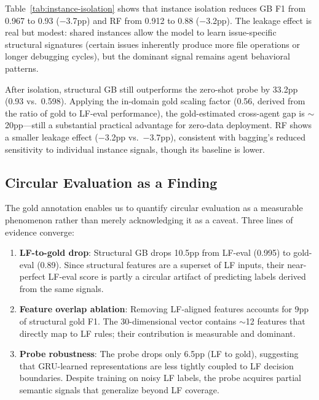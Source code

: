 \documentclass[11pt,a4paper]{article}
\begin{document}
Table~\ref{tab:instance-isolation} shows that instance isolation reduces GB F1 from 0.967 to 0.93 ($-$3.7pp) and RF from 0.912 to 0.88 ($-$3.2pp).
The leakage effect is real but modest: shared instances allow the model to learn issue-specific structural signatures (certain issues inherently produce more file operations or longer debugging cycles), but the dominant signal remains agent behavioral patterns.

After isolation, structural GB still outperforms the zero-shot probe by 33.2pp (0.93 vs.\ 0.598).
Applying the in-domain gold scaling factor (0.56, derived from the ratio of gold to LF-eval performance), the gold-estimated cross-agent gap is $\sim$20pp---still a substantial practical advantage for zero-data deployment.
RF shows a smaller leakage effect ($-$3.2pp vs.\ $-$3.7pp), consistent with bagging's reduced sensitivity to individual instance signals, though its baseline is lower.

\subsection{Circular Evaluation as a Finding}
\label{sec:circular}

The gold annotation enables us to quantify circular evaluation as a measurable phenomenon rather than merely acknowledging it as a caveat.
Three lines of evidence converge:

\begin{enumerate}[leftmargin=*,nosep]
\item \textbf{LF-to-gold drop}: Structural GB drops 10.5pp from LF-eval (0.995) to gold-eval (0.89). Since structural features are a superset of LF inputs, their near-perfect LF-eval score is partly a circular artifact of predicting labels derived from the same signals.

\item \textbf{Feature overlap ablation}: Removing LF-aligned features accounts for 9pp of structural gold F1. The 30-dimensional vector contains $\sim$12 features that directly map to LF rules; their contribution is measurable and dominant.

\item \textbf{Probe robustness}: The probe drops only 6.5pp (LF to gold), suggesting that GRU-learned representations are less tightly coupled to LF decision boundaries. Despite training on noisy LF labels, the probe acquires partial semantic signals that generalize beyond LF coverage.
\end{enumerate}
\end{document}
